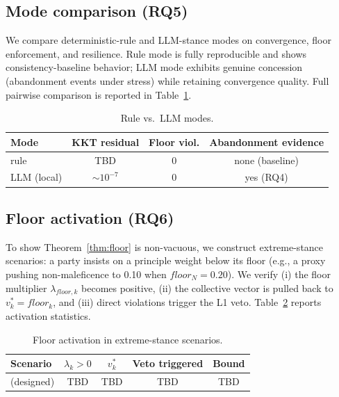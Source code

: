 \documentclass[11pt]{article}
\begin{document}
\subsection{Mode comparison (RQ5)}
\label{sec:rq5}
We compare deterministic-rule and LLM-stance modes on convergence, floor
enforcement, and resilience. Rule mode is fully reproducible and shows
consistency-baseline behavior; LLM mode exhibits genuine concession
(abandonment events under stress) while retaining convergence quality.
Full pairwise comparison is reported in Table~\ref{tab:modes}.
\begin{table}[t]
  \centering
  \caption{Rule vs.\ LLM modes.}
  \label{tab:modes}
  \begin{tabular}{lccc}
    \toprule
    Mode & KKT residual & Floor viol. & Abandonment evidence \\
    \midrule
    rule & TBD & 0 & none (baseline) \\
    LLM (local) & $\sim10^{-7}$ & 0 & yes (RQ4) \\
    \bottomrule
  \end{tabular}
\end{table}

\subsection{Floor activation (RQ6)}
\label{sec:rq6}
To show Theorem~\ref{thm:floor} is non-vacuous, we construct extreme-stance
scenarios: a party insists on a principle weight below its floor (e.g., a
proxy pushing non-maleficence to 0.10 when $floor_N=0.20$). We verify
(i) the floor multiplier $\lambda_{floor,k}$ becomes positive, (ii) the
collective vector is pulled back to $v^{*}_k = floor_k$, and (iii) direct
violations trigger the L1 veto. Table~\ref{tab:floor} reports activation
statistics.
\begin{table}[t]
  \centering
  \caption{Floor activation in extreme-stance scenarios.}
  \label{tab:floor}
  \begin{tabular}{lcccc}
    \toprule
    Scenario & $\lambda_{k}>0$ & $v^{*}_k$ & Veto triggered & Bound \\
    \midrule
    (designed) & TBD & TBD & TBD & TBD \\
    \bottomrule
  \end{tabular}
\end{table}
\end{document}
